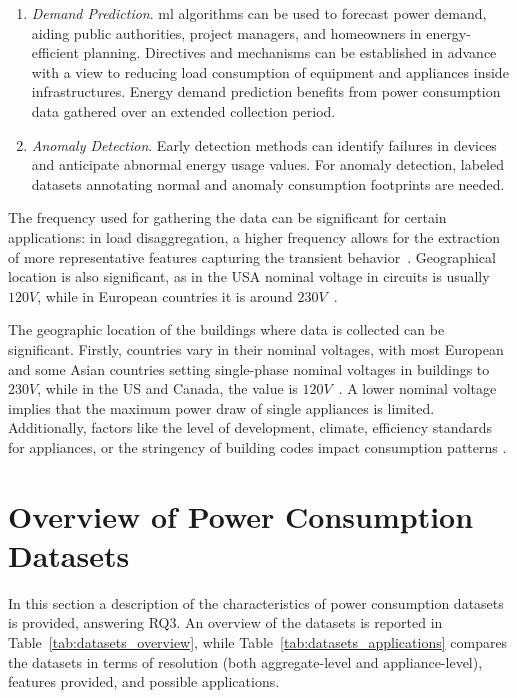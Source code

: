 \begin{enumerate}[label={\textit{A\arabic*.}}, leftmargin=3.5em]
    \item \textit{Demand Prediction}. \acrshort{ml} algorithms can be used to forecast power demand, aiding public authorities, project managers, and homeowners in energy-efficient planning. Directives and mechanisms can be established in advance with a view to reducing load consumption of equipment and appliances inside infrastructures. Energy demand prediction benefits from power consumption data gathered over an extended collection period.

    \item \textit{Anomaly Detection}. Early detection methods can identify failures in devices and anticipate abnormal energy usage values. For anomaly detection, labeled datasets annotating normal and anomaly consumption footprints are needed.
\end{enumerate}

The frequency used for gathering the data can be significant for certain applications: in load disaggregation, a higher frequency allows for the extraction of more representative features capturing the transient behavior~\parencite{carriearmelDisaggregationHolyGrail2013}. Geographical location is also significant, as in the USA nominal voltage in circuits is usually $120V$, while in European countries it is around $230V$~\parencite{internationalelectrotechnicalcommissionWorldPlugs2024}.

The geographic location of the buildings where data is collected can be significant. Firstly, countries vary in their nominal voltages, with most European and some Asian countries setting single-phase nominal voltages in buildings to $230V$, while in the US and Canada, the value is $120V$~\parencite{leeComparisonAnalysisVoltage2017}. A lower nominal voltage implies that the maximum power draw of single appliances is limited. Additionally, factors like the level of development, climate, efficiency standards for appliances, or the stringency of building codes impact consumption patterns \parencite{berardiCrosscountryComparisonBuilding2017}.

\section{Overview of Power Consumption Datasets}

In this section a description of the characteristics of power consumption datasets is provided, answering RQ3. An overview of the datasets is reported in Table~\ref{tab:datasets_overview}, while Table~\ref{tab:datasets_applications} compares the datasets in terms of resolution (both aggregate-level and appliance-level), features provided, and possible applications.

